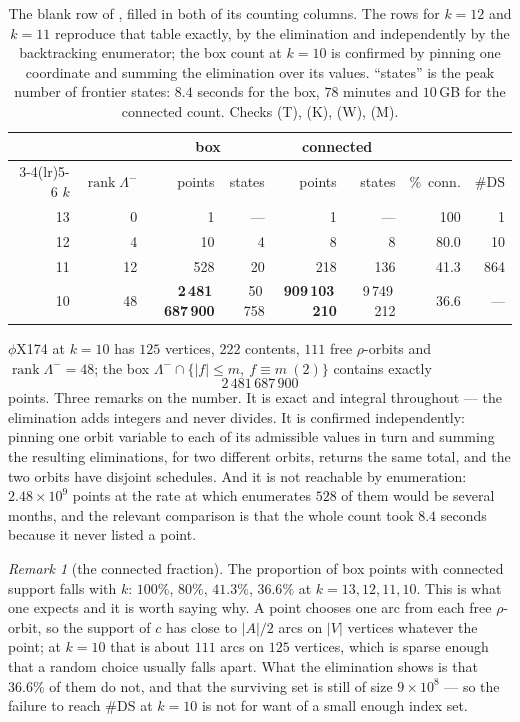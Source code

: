 \documentclass[11pt]{article}
\theoremstyle{plain}
\theoremstyle{definition}
\theoremstyle{remark}
\newtheorem{remark}[theorem]{Remark}
\newcommand{\rank}{\operatorname{rank}}
\newcommand{\DS}{\mathrm{DS}}
\newcommand{\Lm}{\Lambda^{-}}
\begin{document}
\begin{table}[t]
\centering
\small
\begin{tabular}{rrrrrrrr}
\toprule
& & \multicolumn{2}{c}{box} & \multicolumn{2}{c}{connected} & &\\
\cmidrule(lr){3-4}\cmidrule(lr){5-6}
$k$ & $\rank\Lm$ & points & states & points & states & \%\ conn. & $\#\DS$\\
\midrule
13 & 0 & 1 & --- & 1 & --- & 100 & 1\\
12 & 4 & 10 & 4 & 8 & 8 & 80.0 & 10\\
11 & 12 & 528 & 20 & 218 & 136 & 41.3 & 864\\
10 & 48 & \textbf{2\,481\,687\,900} & 50\,758 & \textbf{909\,103\,210} & 9\,749\,212 & 36.6 & ---\\
\bottomrule
\end{tabular}
\caption{The blank row of \cite[Table 2]{Bio8}, filled in both of its counting columns. The
rows for $k=12$ and $k=11$ reproduce that table exactly, by the elimination and independently
by the backtracking enumerator; the box count at $k=10$ is confirmed by pinning one coordinate
and summing the elimination over its values. ``states'' is the peak number of frontier states:
$8.4$ seconds for the box, $78$ minutes and $10$\,GB for the connected count.
Checks (T), (K), (W), (M).}
\label{tab:phix}
\end{table}

$\phi$X174 at $k=10$ has $125$ vertices, $222$ contents, $111$ free $\rho$-orbits and
$\rank\Lm=48$; the box
$\Lm\cap\{|f|\le m,\ f\equiv m\ (2)\}$ contains exactly
\[
2\,481\,687\,900
\]
points. Three remarks on the number. It is exact and integral throughout --- the elimination
adds integers and never divides. It is confirmed independently: pinning one orbit variable to
each of its admissible values in turn and summing the resulting eliminations, for two different
orbits, returns the same total, and the two orbits have disjoint schedules. And it is not
reachable by enumeration: $2.48\times10^9$ points at the rate at which \cite{Bio8} enumerates
$528$ of them would be several months, and the relevant comparison is that the whole count
took $8.4$ seconds because it never listed a point.

\begin{remark}[the connected fraction]\label{rem:frac}
The proportion of box points with connected support falls with $k$: $100\%$, $80\%$, $41.3\%$,
$36.6\%$ at $k=13,12,11,10$. This is what one expects and it is worth saying why. A point
chooses one arc from each free $\rho$-orbit, so the support of $c$ has close to $|A|/2$ arcs on
$|V|$ vertices whatever the point; at $k=10$ that is about $111$ arcs on $125$ vertices, which
is sparse enough that a random choice usually falls apart. What the elimination shows is that
$36.6\%$ of them do not, and that the surviving set is still of size $9\times10^8$ --- so the
failure to reach $\#\DS$ at $k=10$ is not for want of a small enough index set.
\end{remark}
\end{document}
